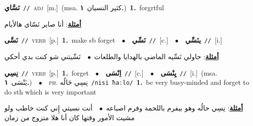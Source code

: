 \documentclass[10pt,a4paper,twoside]{article} %
\begin{document}
\begin{multicols}{2}
{\setlength\topsep{0pt}\textbf{\foreignlanguage{arabic}{نَسَّاي}}\ {\color{gray}\texttt{//}\color{black}}\ \textsc{adj}\ [m.]\ \color{gray}(msa. \foreignlanguage{arabic}{كثير النسيان}~\foreignlanguage{arabic}{\textbf{١.}})\color{black}\ \textbf{1.}~forgrtful\  \begin{flushright}\color{gray}\foreignlanguage{arabic}{\textbf{\underline{\foreignlanguage{arabic}{أمثلة}}}: أنا صاير نَسّاي هالأيام}\end{flushright}\color{black}} \vspace{2mm}

{\setlength\topsep{0pt}\textbf{\foreignlanguage{arabic}{نَسَّى}}\ {\color{gray}\texttt{//}\color{black}}\ \textsc{verb}\ [p.]\ \textbf{1.}~make sb forget\ \ $\bullet$\ \ \setlength\topsep{0pt}\textbf{\foreignlanguage{arabic}{نَسِّي}}\ {\color{gray}\texttt{//}\color{black}}\ [c.]\ \ $\bullet$\ \ \setlength\topsep{0pt}\textbf{\foreignlanguage{arabic}{ينَسِّي}}\ {\color{gray}\texttt{//}\color{black}}\ [i.]\  \begin{flushright}\color{gray}\foreignlanguage{arabic}{\textbf{\underline{\foreignlanguage{arabic}{أمثلة}}}: حاولي نَسِّيه الماضي بالهدايا والطلعات\ $\bullet$\ \  نَسِّيتني شو كنت بدي أحكي}\end{flushright}\color{black}} \vspace{2mm}

{\setlength\topsep{0pt}\textbf{\foreignlanguage{arabic}{نِسِي}}\ {\color{gray}\texttt{//}\color{black}}\ \textsc{verb}\ [p.]\ \textbf{1.}~forget\ \ $\bullet$\ \ \setlength\topsep{0pt}\textbf{\foreignlanguage{arabic}{اِنْسَى}}\ {\color{gray}\texttt{//}\color{black}}\ [c.]\ \ $\bullet$\ \ \setlength\topsep{0pt}\textbf{\foreignlanguage{arabic}{يِنْسَى}}\ {\color{gray}\texttt{//}\color{black}}\ [i.]\ \color{gray}(msa. \foreignlanguage{arabic}{يَنْسَى}~\foreignlanguage{arabic}{\textbf{١.}})\color{black}\ \ $\bullet$\ \ \textsc{ph.} \color{gray} \foreignlanguage{arabic}{نِسِي حَالُه}\color{black}\ {\color{gray}\texttt{/{\sffamily nisi ħaːlo}/}\color{black}}\ \textbf{1.}~be very busy-minded and forget to do sth which is very important\  \begin{flushright}\color{gray}\foreignlanguage{arabic}{\textbf{\underline{\foreignlanguage{arabic}{أمثلة}}}: نِسِي حالُه وهو بيفرم باللحمة وفرم اصباعه\ $\bullet$\ \  أنت نسيتي إِني كنت خاطب ولو مشيت الأمور وقتها كان أنا هلا متزوج من زمان}\end{flushright}\color{black}} \vspace{2mm}


\end{multicols}
\end{document}

